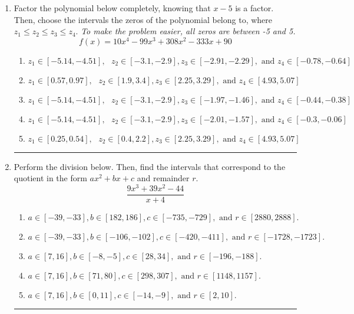 \documentclass[14pt]{extbook}
\newcommand{\litem}[1]{\item#1\hspace*{-1cm}\rule{\textwidth}{0.4pt}}
\begin{document}
\begin{enumerate}
{\begin{enumerate}[label=\Alph*.]
\end{enumerate} }
\litem{
Factor the polynomial below completely, knowing that $x -5$ is a factor. Then, choose the intervals the zeros of the polynomial belong to, where $z_1 \leq z_2 \leq z_3 \leq z_4$. \textit{To make the problem easier, all zeros are between -5 and 5.}\[ f(x) = 10x^{4} -99 x^{3} +308 x^{2} -333 x + 90 \]\begin{enumerate}[label=\Alph*.]
\item \( z_1 \in [-5.14, -4.51], \text{   }  z_2 \in [-3.1, -2.9], z_3 \in [-2.91, -2.29], \text{   and   } z_4 \in [-0.78, -0.64] \)
\item \( z_1 \in [0.57, 0.97], \text{   }  z_2 \in [1.9, 3.4], z_3 \in [2.25, 3.29], \text{   and   } z_4 \in [4.93, 5.07] \)
\item \( z_1 \in [-5.14, -4.51], \text{   }  z_2 \in [-3.1, -2.9], z_3 \in [-1.97, -1.46], \text{   and   } z_4 \in [-0.44, -0.38] \)
\item \( z_1 \in [-5.14, -4.51], \text{   }  z_2 \in [-3.1, -2.9], z_3 \in [-2.01, -1.57], \text{   and   } z_4 \in [-0.3, -0.06] \)
\item \( z_1 \in [0.25, 0.54], \text{   }  z_2 \in [0.4, 2.2], z_3 \in [2.25, 3.29], \text{   and   } z_4 \in [4.93, 5.07] \)

\end{enumerate} }
\litem{
Perform the division below. Then, find the intervals that correspond to the quotient in the form $ax^2+bx+c$ and remainder $r$.\[ \frac{9x^{3} +39 x^{2} -44}{x + 4} \]\begin{enumerate}[label=\Alph*.]
\item \( a \in [-39, -33], b \in [182, 186], c \in [-735, -729], \text{ and } r \in [2880, 2888]. \)
\item \( a \in [-39, -33], b \in [-106, -102], c \in [-420, -411], \text{ and } r \in [-1728, -1723]. \)
\item \( a \in [7, 16], b \in [-8, -5], c \in [28, 34], \text{ and } r \in [-196, -188]. \)
\item \( a \in [7, 16], b \in [71, 80], c \in [298, 307], \text{ and } r \in [1148, 1157]. \)
\item \( a \in [7, 16], b \in [0, 11], c \in [-14, -9], \text{ and } r \in [2, 10]. \)


\end{enumerate}}
\end{enumerate}
\end{document}
